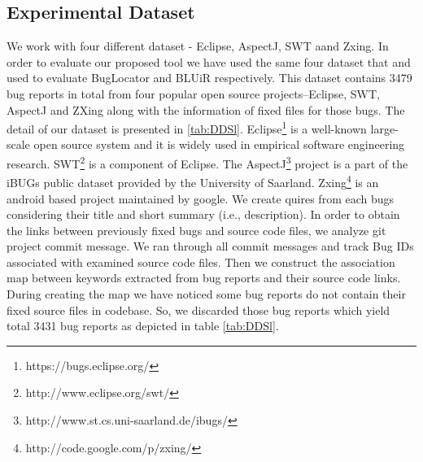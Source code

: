 \documentclass[conference]{IEEEtran}
\begin{document}
\subsection{Experimental Dataset}
We work with four different dataset - Eclipse, AspectJ, SWT aand Zxing.
In order to evaluate our proposed tool we have used the same four dataset that \citet{Jian} and \citet{Saha} used
to evaluate BugLocator and BLUiR respectively. This dataset contains 3479 bug reports in total from four popular open source projects–Eclipse, SWT, AspectJ and ZXing along with the information of fixed files for those bugs.
The detail of our dataset is presented in \ref{tab:DDSl}. 
Eclipse\footnote{https://bugs.eclipse.org/} is a well-known large-scale open source system and it is widely used in empirical software engineering research.
SWT\footnote{http://www.eclipse.org/swt/} is a component of Eclipse.
The AspectJ\footnote{http://www.st.cs.uni-saarland.de/ibugs/} project is a part of the iBUGs public dataset provided by the University of Saarland. 
Zxing\footnote{http://code.google.com/p/zxing/} is an android based project maintained by google.
We create quires from each bugs considering their title and short summary (i.e., description).
In order to obtain the links between previously fixed bugs and source code files, we analyze git project commit message. We ran through all commit messages and track Bug IDs associated with examined source code files. Then we construct the association map between keywords extracted from bug reports and their source code links. During creating the map we have noticed some bug reports do not contain their fixed source files in codebase. So, we discarded those bug reports which yield total 3431 bug reports as depicted in table \ref{tab:DDSl}.
 
\end{document}
